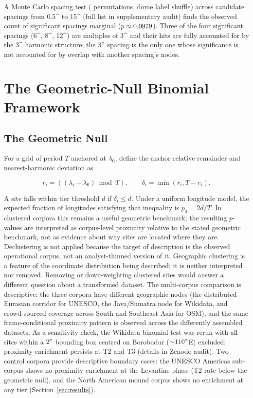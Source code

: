 \documentclass[12pt,a4paper]{article}
\newcommand{\degr}{\ifmmode^\circ\else\textdegree{}\fi}
\begin{document}
A Monte Carlo spacing test (\simNperms{} permutations, dome label
shuffle) across \mcNcandidates{} candidate spacings from 0.5\degr{} to 15\degr{}
(full list in supplementary audit) finds the observed count of
\mcDomeNsigObs{} significant spacings marginal ($p \approx 0.0979{}$).
Three of the four significant spacings (6\degr{}, 8\degr{}, 12\degr{}) are
multiples of 3\degr{} and their hits are fully accounted for by the
3\degr{} harmonic structure; the $3\degr$ spacing is the only one whose
significance is not accounted for by overlap with another spacing's nodes.

\section{The Geometric-Null Binomial Framework}
\label{sec:framework}

\subsection{The Geometric Null}

For a grid of period $T$ anchored at $\lambda_0$, define the
anchor-relative remainder and nearest-harmonic deviation as

\[
r_i = ((\lambda_i - \lambda_0) \bmod T), \qquad
\delta_i = \min(r_i, T-r_i).
\]

A site falls within tier threshold $d$ if $\delta_i \leq d$. Under a
uniform longitude model, the expected fraction of longitudes satisfying
that inequality is $p_0 = 2d/T$. In clustered corpora this remains a
useful geometric benchmark; the resulting $p$-values are interpreted as
corpus-level proximity relative to the stated geometric benchmark, not
as evidence about why sites are located where they are. Declustering is
not applied because the target of description is the observed
operational corpus, not an analyst-thinned version of it. Geographic
clustering is a feature of the coordinate distribution being described;
it is neither interpreted nor removed. Removing or down-weighting
clustered sites would answer a different question about a transformed
dataset. The multi-corpus comparison is descriptive: the three corpora
have different geographic nodes (the distributed Eurasian corridor for
UNESCO, the Java/Sumatra node for Wikidata, and crowd-sourced coverage
across South and Southeast Asia for OSM), and the same frame-conditional
proximity pattern is observed across the differently assembled datasets.
As a sensitivity check, the Wikidata binomial test was rerun with all
sites within a $2\degr$ bounding box centred on Borobudur
(${\sim}110\degr$E) excluded; proximity enrichment persists at T2 and
T3 (details in Zenodo audit). Two control corpora provide descriptive
boundary cases: the UNESCO Americas sub-corpus shows no proximity
enrichment at the Levantine phase (T2 rate below the geometric null),
and the North American mound corpus shows no enrichment at any tier
(Section~\ref{sec:results}).
\end{document}
